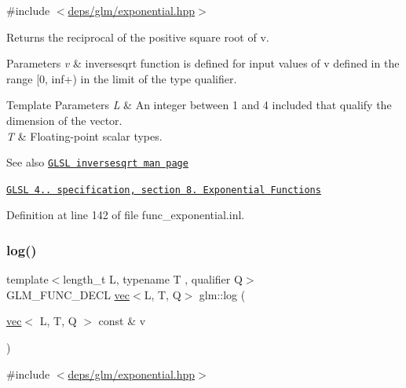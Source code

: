 {\ttfamily \#include $<$\hyperlink{exponential_8hpp}{deps/glm/exponential.\+hpp}$>$}

Returns the reciprocal of the positive square root of v.


\begin{DoxyParams}{Parameters}
{\em v} & inversesqrt function is defined for input values of v defined in the range \mbox{[}0, inf+) in the limit of the type qualifier. \\
\hline
\end{DoxyParams}

\begin{DoxyTemplParams}{Template Parameters}
{\em L} & An integer between 1 and 4 included that qualify the dimension of the vector. \\
\hline
{\em T} & Floating-\/point scalar types.\\
\hline
\end{DoxyTemplParams}
\begin{DoxySeeAlso}{See also}
\href{http://www.opengl.org/sdk/docs/manglsl/xhtml/inversesqrt.xml}{\tt G\+L\+SL inversesqrt man page} 

\href{http://www.opengl.org/registry/doc/GLSLangSpec.4.20.8.pdf}{\tt G\+L\+SL 4.. specification, section 8. Exponential Functions} 
\end{DoxySeeAlso}


Definition at line 142 of file func\+\_\+exponential.\+inl.

\mbox{\label{group__core__func__exponential_ga918c9f3fd086ce20e6760c903bd30fa9}} 
\subsubsection{\texorpdfstring{log()}{log()}}
{\footnotesize\ttfamily template$<$length\+\_\+t L, typename T , qualifier Q$>$ \\
G\+L\+M\+\_\+\+F\+U\+N\+C\+\_\+\+D\+E\+CL \hyperlink{structglm_1_1vec}{vec}$<$L, T, Q$>$ glm\+::log (\begin{DoxyParamCaption}\item[{\hyperlink{structglm_1_1vec}{vec}$<$ L, T, Q $>$ const \&}]{v }\end{DoxyParamCaption})}



{\ttfamily \#include $<$\hyperlink{exponential_8hpp}{deps/glm/exponential.\+hpp}$>$}

